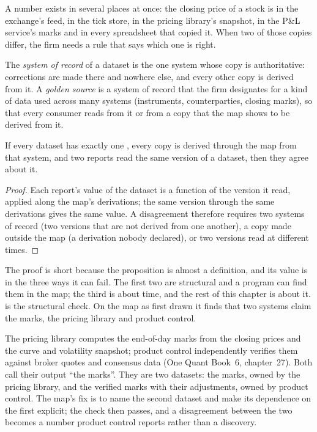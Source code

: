 A number exists in several places at once: the closing price of a stock is in the exchange's feed, in the tick store, in the
pricing library's snapshot, in the P\&L service's marks and in every spreadsheet that copied it. When two of those copies
differ, the firm needs a rule that says which one is right.

\begin{definition}\label{def:pl:the-platform-map:sor}
The \emph{system of record} of a dataset is the one system whose copy is authoritative: corrections are
made there and nowhere else, and every other copy is derived from it. A \emph{golden source} is a system of
record that the firm designates for a kind of data used across many systems (instruments, counterparties, closing marks), so
that every consumer reads from it or from a copy that the map shows to be derived from it.
\end{definition}

\begin{proposition}\label{prop:pl:the-platform-map:oneowner}
If every dataset has exactly one , every copy is derived through the map from that system, and two reports read
the same version of a dataset, then they agree about it.
\end{proposition}

\begin{proof}
Each report's value of the dataset is a function of the version it read, applied along the map's derivations; the same version
through the same derivations gives the same value. A disagreement therefore requires two systems of record (two versions that
are not derived from one another), a copy made outside the map (a derivation nobody declared), or two versions read at
different times.
\end{proof}

The proof is short because the proposition is almost a definition, and its value is in the three ways it can fail. The first
two are structural and a program can find them in the map; the third is about time, and the rest of this chapter is about it.
 is the structural check. On the map as first drawn it finds that two systems claim the
marks, the pricing library and product control.

\begin{example}\label{ex:pl:the-platform-map:marks}
The pricing library computes the end-of-day marks from the closing prices and the curve and volatility snapshot; product
control independently verifies them against broker quotes and consensus data (One Quant Book~6, chapter~27). Both call their
output ``the marks''. They are two datasets: the marks, owned by the pricing library, and the verified marks with their
adjustments, owned by product control. The map's fix is to name the second dataset and make its dependence on the first
explicit; the check then passes, and a disagreement between the two becomes a number product control reports rather than a
discovery.
\end{example}

